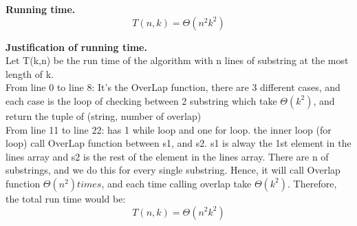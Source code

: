 \documentclass[11pt]{article}
\begin{document}
\noindent
\textbf{Running time.}
$$\boxed{T(n,k) = \Theta(n^2k^2)}$$ 


\noindent
\textbf{Justification of running time.}\\
Let T(k,n) be the run time of the algorithm with n lines of substring at the most length of k.\\
From line 0 to line 8: It's the OverLap function, there are 3 different cases, and each case is the loop of checking between 2 substring which take $\Theta(k^2)$, and return the tuple of (string, number of overlap)\\
From line 11 to line 22: has 1 while loop and one for loop. the inner loop (for loop) call OverLap function between s1, and s2. s1 is alway the 1st element in the lines array and s2 is the rest of the element in the lines array. There are n of substrings, and we do this for every single substring. Hence, it will call Overlap function $\Theta(n^2) times$, and each time calling overlap take $\Theta(k^2)$. Therefore, the total run time would be:
$$\boxed{T(n,k) = \Theta(n^2k^2)}$$ 
\newpage
\end{document}
